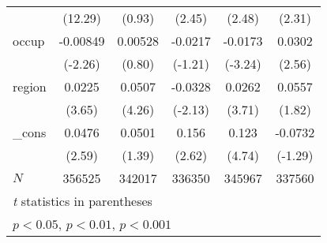 \begin{table}[htbp]
\begin{tabular}{l*{5}{c}}
            &     (12.29)         &      (0.93)         &      (2.45)         &      (2.48)         &      (2.31)         \\
occup       &    -0.00849\sym{*}  &     0.00528         &     -0.0217         &     -0.0173\sym{**} &      0.0302\sym{*}  \\
            &     (-2.26)         &      (0.80)         &     (-1.21)         &     (-3.24)         &      (2.56)         \\
region      &      0.0225\sym{***}&      0.0507\sym{***}&     -0.0328\sym{*}  &      0.0262\sym{***}&      0.0557         \\
            &      (3.65)         &      (4.26)         &     (-2.13)         &      (3.71)         &      (1.82)         \\
\_cons      &      0.0476\sym{**} &      0.0501         &       0.156\sym{**} &       0.123\sym{***}&     -0.0732         \\
            &      (2.59)         &      (1.39)         &      (2.62)         &      (4.74)         &     (-1.29)         \\
\hline
\(N\)       &      356525         &      342017         &      336350         &      345967         &      337560         \\
\hline\hline
\multicolumn{6}{l}{\footnotesize \textit{t} statistics in parentheses}\\
\multicolumn{6}{l}{\footnotesize \sym{*} \(p<0.05\), \sym{**} \(p<0.01\), \sym{***} \(p<0.001\)}\\
\end{tabular}
\label{tab:oaxaca_female}
\end{table}
